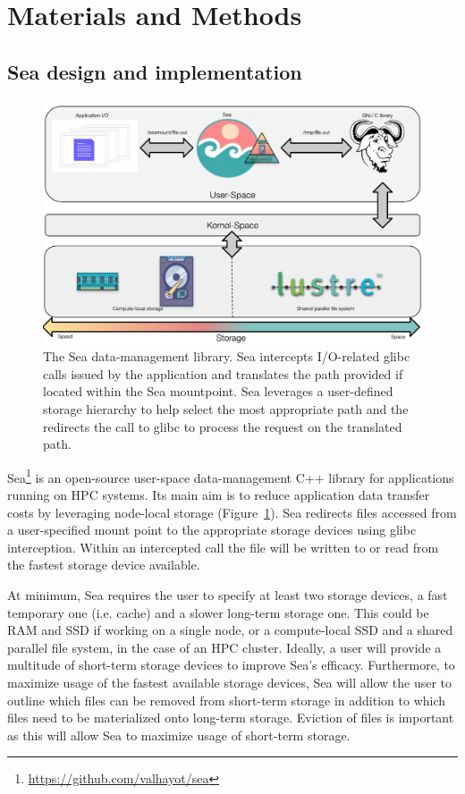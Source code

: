 \documentclass[10pt,journal,compsoc]{IEEEtran}
\begin{document}
\section{Materials and Methods}

\subsection{Sea design and implementation}

\begin{figure}

    \centering
    \includegraphics[width=\columnwidth]{figures/seacomp-diagram.pdf}%
\caption{The Sea data-management library. Sea intercepts I/O-related glibc calls issued by the application and
translates the path provided if located within the Sea mountpoint. Sea leverages a user-defined storage hierarchy to help select the most appropriate path and the redirects the call to glibc to process the request on the translated path. }
\label{fig:sea-comp:diagram}
\end{figure}

Sea\footnote{\url{https://github.com/valhayot/sea}} is an open-source user-space
data-management C++ library for applications running on HPC systems. Its main
aim is to reduce application data transfer costs by leveraging node-local
storage (Figure~\ref{fig:sea-comp:diagram}). Sea redirects files accessed from a user-specified mount point to the
appropriate storage devices using glibc interception. Within an intercepted call
the file will be written to or read from the fastest storage device available. 


At minimum, Sea requires the user to specify at least two storage devices, a
fast temporary one (i.e. cache) and a slower long-term storage one. This could be RAM and SSD
if working on a single node, or a compute-local SSD and a shared parallel file
system, in the case of an HPC cluster. Ideally, a user will provide a multitude
of short-term storage devices to improve Sea's efficacy. Furthermore, to
maximize usage of the fastest available storage devices, Sea will allow the user
to outline which files can be removed from short-term storage in addition to
which files need to be materialized onto long-term storage. Eviction of files is
important as this will allow Sea to maximize usage of short-term storage.
\end{document}

